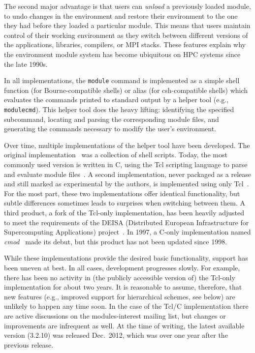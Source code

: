 \noindent
The second major advantage is that users can \emph{unload} a previously
loaded module, to undo changes in the environment and restore their
environment to the one they had before they loaded a particular module.  This means
that users maintain control of their working environment as they switch between
different versions of the applications, libraries, compilers, or MPI stacks.  These features explain why the environment module
system has become ubiquitous on HPC systems since the late 1990s.


%

In all implementations, the \texttt{\small module} command
is implemented as a simple shell function (for Bourne-compatible shells) or
alias (for csh-compatible shells) which evaluates the commands printed to standard output by a
helper tool (e.g., \texttt{\small modulecmd}). This helper tool
does the heavy lifting: identifying the specified subcommand,
locating and parsing the corresponding module files, and generating the
commands necessary to modify the user's environment.

Over time, multiple implementations of the helper tool
have been developed. The original implementation~\cite{furlani91} was a collection
of shell scripts. Today, the most commonly used version is written in C, using
the Tcl scripting language to parse and evaluate module files~\cite{em}. A second
implementation, never packaged as a release and still marked as
experimental by the authors, is implemented using only Tcl~\cite{em}. For the most
part, these two implementations
offer identical functionality, but subtle differences sometimes leads to surprises when switching between them. A third product,
a
fork of the Tcl-only implementation, has been heavily adjusted to meet
the requirements of the DEISA (Distributed European Infrastructure for
Supercomputing Applications) project~\cite{wikiDEISA}.  In
1997, a C-only implementation named \emph{cmod}~\cite{cmod} made its debut, but this product has not been updated since 1998.



While these implementations provide the desired basic functionality, support has been uneven at best. In all cases, development
progresses slowly. For example, there has been no activity in
(the publicly accessible version of) the Tcl-only
implementation for about two years. It is reasonable to assume, therefore, that new features (e.g., improved support for hierarchical schemes, see below) are
unlikely to happen any time soon. In the case of the Tcl/C implementation
there are active discussions on the modules-interest mailing list, but
changes or improvements are infrequent as well. At the time of writing, the
latest available version (3.2.10) was released Dec.~2012, which was over one year
after the previous release.

